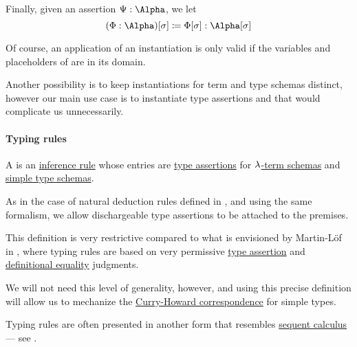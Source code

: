 \begin{definition}
\begin{thmenum}
     Finally, given an assertion \( \Psi: \Alpha \), we let
    \begin{equation}\label{eq:def:lambda_schema_instantiation/assertion}
      (\Phi: \Alpha)[\sigma] \coloneqq \Phi[\sigma]: \Alpha[\sigma]
    \end{equation}
  \end{thmenum}
\end{definition}
\begin{comments}
  \item Of course, an application of an instantiation is only valid if the variables and placeholders of are in its domain.

  \item Another possibility is to keep instantiations for term and type schemas distinct, however our main use case is to instantiate type assertions and that would complicate us unnecessarily.
\end{comments}

\paragraph{Typing rules}

\begin{definition}\label{def:simple_typing_rule}\mimprovised
  A  is an \hyperref[def:inference_rule]{inference rule} whose entries are \hyperref[def:type_assertion]{type assertions} for \hyperref[def:lambda_term_schema]{\( \mathrm{\lambda} \)-term schemas} and \hyperref[def:simple_type_schema]{simple type schemas}.

  As in the case of natural deduction rules defined in , and using the same formalism, we allow dischargeable type assertions to be attached to the premises.
\end{definition}
\begin{comments}
  \item This definition is very restrictive compared to what is envisioned by Martin-L\"of in \cite{MartinLöf1984IntTypeTheory}, where typing rules are based on very permissive \hyperref[def:type_assertion]{type assertion} and \hyperref[con:definitional_equality]{definitional equality} judgments.

  We will not need this level of generality, however, and using this precise definition will allow us to mechanize the \hyperref[con:curry_howard_correspondence]{Curry-Howard correspondence} for simple types.

  \item Typing rules are often presented in another form that resembles \hyperref[rem:sequent_calculus]{sequent calculus} --- see .
\end{comments}

